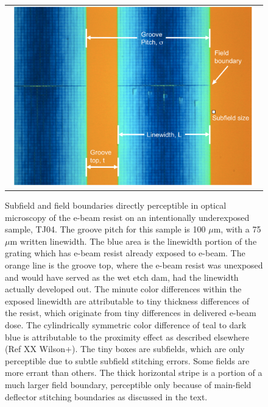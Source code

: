 \documentclass[]{spie}  %
\begin{document}
\begin{figure}
\begin{center}
 \begin{tabular}{c}
    \includegraphics[width=0.96\textwidth]{figs/subfields_TJ04_Zeiss.pdf}
   \end{tabular}
  \end{center}
  \caption[TJ04 under Zeiss]{\label{fig:TJ04Zeiss} Subfield and field boundaries directly perceptible in optical microscopy of the e-beam resist on an intentionally underexposed sample, TJ04.  The groove pitch for this sample is 100 $\mu$m, with a 75 $\mu$m written linewidth.  The blue area is the linewidth portion of the grating which has e-beam resist already exposed to e-beam.  The orange line is the groove top, where the e-beam resist was unexposed and would have served as the wet etch dam, had the linewidth actually developed out.  The minute color differences within the exposed linewidth are attributable to tiny thickness differences of the resist, which originate from tiny differences in delivered e-beam dose.  The cylindrically symmetric color difference of teal to dark blue is attributable to the proximity effect as described elsewhere (Ref XX Wilson+).  The tiny boxes are subfields, which are only perceptible due to subtle subfield stitching errors.  Some fields are more errant than others.  The thick horizontal stripe is a portion of a much larger field boundary, perceptible only because of main-field deflector stitching boundaries as discussed in the text.}
\end{figure}
\end{document}
